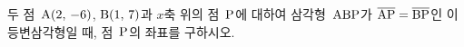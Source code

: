 두 점~$\mathrm{A}(2,\,-6)$, $\mathrm{B}(1,\,7)$과 $x$축 위의 점~$\mathrm{P}$에 대하여 삼각형~$\mathrm{ABP}$가 $\overline{\mathrm{AP}}=\overline{\mathrm{BP}}$인 이등변삼각형일 때, 점~$\mathrm{P}$의 좌표를 구하시오.
